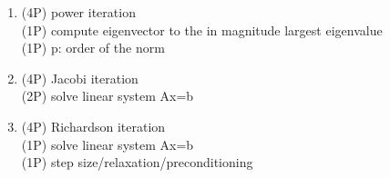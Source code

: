 {\color{solution}
\begin{enumerate}
\item \textcolor{exampoints}{(4P)} power iteration\\
\textcolor{exampoints}{(1P)} compute eigenvector to the in magnitude largest eigenvalue\\
\textcolor{exampoints}{(1P)} p: order of the norm
\item \textcolor{exampoints}{(4P)} Jacobi iteration\\
\textcolor{exampoints}{(2P)} solve linear system Ax=b
\item \textcolor{exampoints}{(4P)} Richardson iteration\\
\textcolor{exampoints}{(1P)}  solve linear system Ax=b\\
\textcolor{exampoints}{(1P)} step size/relaxation/preconditioning
\end{enumerate}
}

